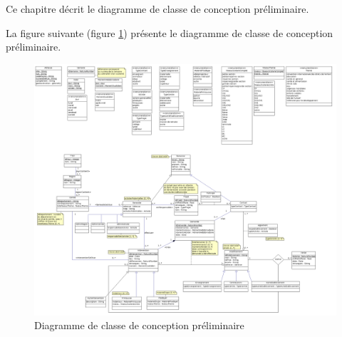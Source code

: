 Ce chapitre décrit le diagramme de classe de conception préliminaire.

La figure suivante (figure \ref{diagrammeClasse}) présente le diagramme de classe de conception préliminaire.
\begin{figure}[H]
	\centering
	\includegraphics[scale=0.25]{images/diagrammeClasses/diagrammeDeClasses.png}
	\caption{Diagramme de classe de conception préliminaire}
	\label{diagrammeClasse}
\end{figure}